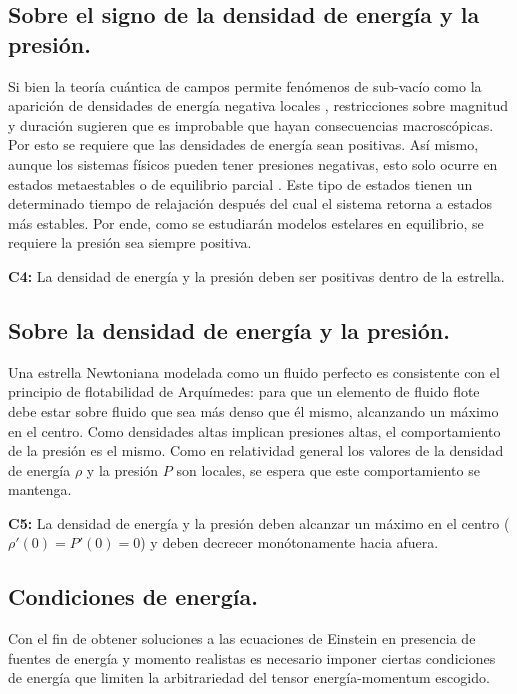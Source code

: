 \subsection*{Sobre el signo de la densidad de energía y la presión.}
\noindent Si bien la teoría cuántica de campos permite fenómenos de sub-vacío como la aparición de densidades de energía negativa locales \cite{Ford2010}, restricciones sobre magnitud y duración sugieren que es improbable que hayan consecuencias macroscópicas. Por esto se requiere que las densidades de energía sean positivas.
Así mismo, aunque los sistemas físicos pueden tener presiones negativas, esto solo ocurre en estados metaestables o de equilibrio parcial \cite{Landau1980}. Este tipo de estados tienen un determinado tiempo de relajación después del cual el sistema retorna a estados más estables. Por ende, como se estudiarán modelos estelares en equilibrio, se requiere la presión sea siempre positiva. 

\textbf{C4:} La densidad de energía y la presión deben ser positivas dentro de la estrella. 

\subsection*{Sobre la densidad de energía y la presión.}

\noindent Una estrella Newtoniana modelada como un fluido perfecto es consistente con el principio de flotabilidad de Arquímedes: para que un elemento de fluido flote debe estar sobre fluido que sea más denso que él mismo, alcanzando un máximo en el centro. Como densidades altas implican presiones altas, el comportamiento de la presión es el mismo. Como en relatividad general los valores de la densidad de energía $\rho$ y la presión $P$ son locales, se espera que este comportamiento se mantenga.

\textbf{C5:} La densidad de energía y la presión deben alcanzar un máximo en el centro ($\rho'(0)=P'(0)=0$) y deben decrecer monótonamente hacia afuera.

\subsection*{Condiciones de energía.}
\noindent Con el fin de obtener soluciones a las ecuaciones de Einstein en presencia de fuentes de energía y momento realistas es necesario imponer ciertas condiciones de energía que limiten la arbitrariedad del tensor energía-momentum escogido.

